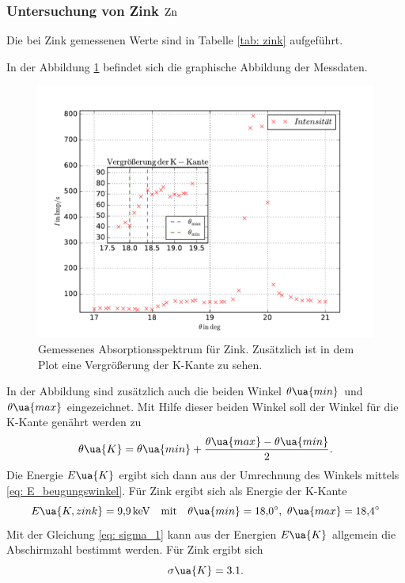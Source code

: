 \subsubsection{Untersuchung von Zink $\ce{Zn}$}\label{sec: zink}
Die bei Zink gemessenen Werte sind in Tabelle \ref{tab: zink} aufgeführt.

In der Abbildung \ref{fig: absotp_zink} befindet sich die graphische Abbildung der Messdaten.
\begin{figure}
  \centering
  \includegraphics[width=1\textwidth]{../Messdaten/zink.pdf}
  \caption{Gemessenes Absorptionsspektrum für Zink. Zusätzlich ist in dem Plot eine Vergrößerung der K-Kante zu sehen.} %
  \label{fig: absotp_zink}
\end{figure}
In der Abbildung sind zusätzlich auch die beiden Winkel $\theta\ua{min}$ und $\theta\ua{max}$
eingezeichnet. Mit Hilfe dieser beiden Winkel soll der Winkel für die K-Kante genährt werden zu %
\begin{equation}
  \label{eq:theta_k}
  \theta\ua{K}=\theta\ua{min}+\frac{\theta\ua{max}-\theta\ua{min}}{2}.
\end{equation}
Die Energie $E\ua{K}$ ergibt sich dann aus der Umrechnung des Winkels mittels \eqref{eq: E_beugungswinkel}.
Für Zink ergibt sich als Energie der K-Kante
\begin{equation*}
  E\ua{K,zink}=\SI{9.9}{\kilo\eV} \quad \text{mit}\quad \theta\ua{min}=\SI{18.0}{\degree},\, \,   \theta\ua{max}=\SI{18.4}{\degree}
\end{equation*}
Mit der Gleichung \eqref{eq: sigma_1} kann aus der Energien $E\ua{K}$ allgemein die Abschirmzahl
bestimmt werden.
Für Zink ergibt sich
\begin{equation}
  \label{eq: abschirm_zink}
  \sigma\ua{K}=3.1.
\end{equation}
\FloatBarrier
\FloatBarrier
